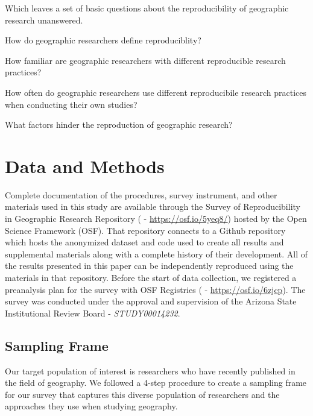 \documentclass[]{interact}
\theoremstyle{plain}%
\theoremstyle{definition}
\theoremstyle{remark}
\begin{document}
Which leaves a set of basic questions about the reproducibility of geographic research unanswered.  


\begin{description}
\setlength{\itemindent}{0ex}
    \item[\textbf{(Q1)}] How do geographic researchers define reproduciblity?
    \item[\textbf{(Q2)}] How familiar are geographic researchers with different reproducible research practices?
    \item[\textbf{(Q3)}] How often do geographic researchers use different reproducibile research practices when conducting their own studies? 
    \item[\textbf{(Q4)}] What factors hinder the reproduction of geographic research?
\end{description}


\section*{Data and Methods}
Complete documentation of the procedures, survey instrument, and other materials used in this study are available through the Survey of Reproducibility in Geographic Research Repository (\citet{Kedron_Holler_Bardin_Hilgendorf_2022} - \url{https://osf.io/5yeq8/}) hosted by the Open Science Framework (OSF).
That repository connects to a Github repository which hosts the anonymized dataset and code used to create all results and supplemental materials along with a complete history of their development. 
All of the results presented in this paper can be independently reproduced using the materials in that repository.
Before the start of data collection, we registered a preanalysis plan for the survey with OSF Registries (\citet{Kedron_Survey_PAP} - \url{https://osf.io/6zjcp}). 
The survey was conducted under the approval and supervision of the Arizona State Institutional Review Board - \textit{STUDY00014232}.

\subsection*{Sampling Frame}
Our target population of interest is researchers who have recently published in the field of geography. 
We followed a 4-step procedure to create a sampling frame for our survey that captures this diverse population of researchers and the approaches they use when studying geography. 
\end{document}
